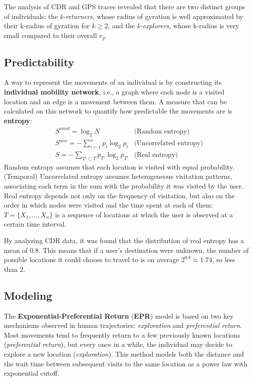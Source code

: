 The analysis of CDR and GPS traces revealed that there are two distinct groups of individuals: the \textit{k-returners}, whose radius of gyration is well approximated by their k-radius of gyration for $k \geq 2$, and the \textit{k-explorers}, whose k-radius is very small compared to their overall $r_g$.

\subsection{Predictability}
A way to represent the movements of an individual is by constructing its \textbf{individual mobility network}, i.e., a graph where each node is a visited location and an edge is a movement between them. A measure that can be calculated on this network to quantify how predictable the movements are is \textbf{entropy}:
\begin{align*}
    &S^{\textit{rand}} = \log_2 N &\text{(Random entropy)} \\
    &S^{\textit{unc}} = - \sum_{i=1}^n p_i \log_2 p_i &\text{(Uncorrelated entropy)} \\
    &S = -\sum_{T' \subset T} p_{T'} \log_2 p_{T'} &\text{(Real entropy)}
\end{align*}
Random entropy assumes that each location is visited with equal probability. (Temporal) Uncorrelated entropy assumes heterogeneous visitation patterns, associating each term in the sum with the probability it was visited by the user. Real entropy depends not only on the frequency of visitation, but also on the order in which nodes were visited and the time spent at each of them: $T = \{X_1, \dots, X_n\}$ is a sequence of locations at which the user is observed at a certain time interval.

By analyzing CDR data, it was found that the distribution of real entropy has a mean of 0.8. This means that if a user's destination were unknown, the number of possible locations it could choose to travel to is on average $2^{0.8} \approx 1.74$, so less than 2.

\subsection{Modeling}

The \textbf{Exponential-Preferential Return} (\textbf{EPR}) model is based on two key mechanisms observed in human trajectories: \textit{exploration} and \textit{preferential return}. Most movements tend to frequently return to a few previously known locations (\textit{preferential return}), but every once in a while, the individual may decide to explore a new location (\textit{exploration}). This method models both the distance and the wait time between subsequent visits to the same location as a power law with exponential cutoff.

